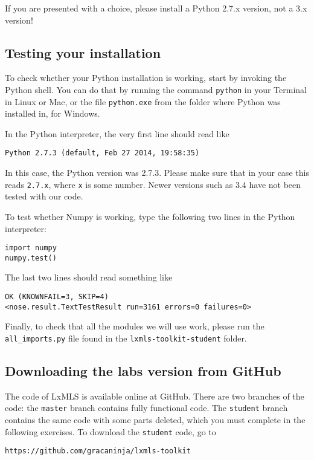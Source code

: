 If you are presented with a choice, please install a Python 2.7.x version, not a 3.x version!

\subsection{Testing your installation}

To check whether your Python installation is working, start by invoking the Python shell. You can do that by running the command \verb+python+ in your Terminal in Linux or Mac, or the file \verb+python.exe+ from the folder where Python was installed in, for Windows.

In the Python interpreter, the very first line should read like
\begin{verbatim}
Python 2.7.3 (default, Feb 27 2014, 19:58:35)
\end{verbatim}
%
In this case, the Python version was 2.7.3. Please make sure that in your case this reads \verb+2.7.x+, where \verb+x+ is some number. Newer versions such as 3.4 have not been tested with our code.

To test whether Numpy is working, type the following two lines in the Python interpreter:
%
\begin{verbatim}
import numpy
numpy.test()
\end{verbatim}
%
The last two lines should read something like
%
\begin{verbatim}
OK (KNOWNFAIL=3, SKIP=4)
<nose.result.TextTestResult run=3161 errors=0 failures=0>
\end{verbatim}

Finally, to check that all the modules we will use work, please run the \verb+all_imports.py+ file found in the \verb+lxmls-toolkit-student+ folder.

\subsection{Downloading the labs version from GitHub}

The code of LxMLS is available online at GitHub. There are two branches of the code: the \verb+master+ branch contains fully functional code. The \verb+student+ branch contains the same code with some parts deleted, which you must complete in the following exercises. To download the \verb+student+ code, go to

\begin{verbatim}
https://github.com/gracaninja/lxmls-toolkit
\end{verbatim}

